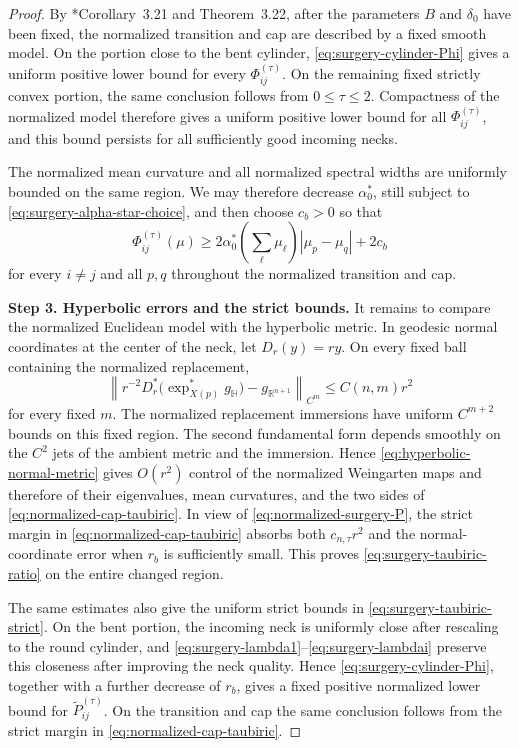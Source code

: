 \documentclass[11pt,reqno]{amsart}
\theoremstyle{definition}
\theoremstyle{remark}
\numberwithin{equation}{section}
\newcommand{\Hh}{\mathbb H}
\begin{document}
\begin{proof}
By \cite{HS09}*{Corollary~3.21 and Theorem~3.22}, after the parameters
$B$ and $\delta_0$ have been fixed, the normalized transition and cap
are described by a fixed smooth model.  On the portion close to the
bent cylinder, \eqref{eq:surgery-cylinder-Phi} gives a uniform positive
lower bound for every $\Phi_{ij}^{(\tau)}$.  On the remaining fixed
strictly convex portion, the same conclusion follows from
$0\leq\tau\leq2$.  Compactness of the normalized model therefore gives
a uniform positive lower bound for all $\Phi_{ij}^{(\tau)}$, and this
bound persists for all sufficiently good incoming necks.

The normalized mean curvature and all normalized spectral widths are
uniformly bounded on the same region.  We may therefore decrease
$\alpha_0^*$, still subject to \eqref{eq:surgery-alpha-star-choice},
and then choose $c_b>0$ so that
\begin{equation}\label{eq:normalized-cap-taubiric}
 \Phi_{ij}^{(\tau)}(\mu)
 \geq
 2\alpha_0^*
 \left(\sum_\ell\mu_\ell\right)
 |\mu_p-\mu_q|+2c_b
\end{equation}
for every $i\ne j$ and all $p,q$ throughout the normalized transition
and cap.

\textbf{Step 3. Hyperbolic errors and the strict bounds.}   It remains to compare the normalized Euclidean model with the hyperbolic
  metric.  In geodesic normal coordinates at the center of the neck, let
  $D_r(y)=ry$.
  On every fixed ball containing the normalized replacement,
  \begin{equation}\label{eq:hyperbolic-normal-metric}
    \left\|
    r^{-2}D_r^*\bigl(\exp_{X(p)}^*g_{\Hh}\bigr)
    -g_{\mathbb R^{n+1}}
    \right\|_{C^m}
    \leq C(n,m)r^2
  \end{equation}
  for every fixed $m$.  The normalized replacement immersions have uniform
  $C^{m+2}$ bounds on this fixed region.  The second fundamental form depends
  smoothly on the $C^2$ jets of the ambient metric and the immersion.  Hence
  \eqref{eq:hyperbolic-normal-metric} gives $O(r^2)$ control of the normalized
  Weingarten maps and therefore of their eigenvalues, mean curvatures, and the
  two sides of \eqref{eq:normalized-cap-taubiric}.  In view of
  \eqref{eq:normalized-surgery-P}, the strict margin in
  \eqref{eq:normalized-cap-taubiric} absorbs both $c_{n,\tau}r^2$ and the
  normal-coordinate error when $r_b$ is sufficiently small.  This proves
  \eqref{eq:surgery-taubiric-ratio} on the entire changed region.

 The same estimates also give the uniform strict bounds in
\eqref{eq:surgery-taubiric-strict}.  On the bent portion, the incoming
neck is uniformly close after rescaling to the round cylinder, and
\eqref{eq:surgery-lambda1}--\eqref{eq:surgery-lambdai} preserve this
closeness after improving the neck quality.  Hence
\eqref{eq:surgery-cylinder-Phi}, together with a further decrease of
$r_b$, gives a fixed positive normalized lower bound for
$\widetilde P_{ij}^{(\tau)}$.  On the transition and cap the same
conclusion follows from the strict margin in
\eqref{eq:normalized-cap-taubiric}.


\end{proof}
\end{document}
